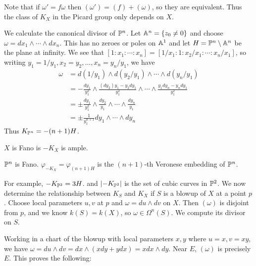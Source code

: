 \documentclass[twoside, 10pt]{article}
\begin{document}
        Note that if $\omega' = f\omega$ then $(\omega') = (f) + (\omega)$, so
        they are equivalent. Thus the class of $K_X$ in the Picard group only
        depends on $X$.

        \begin{exm} We calculate the canonical divisor of $\P^n$. Let $\A^n =
            \{ z_0 \neq 0 \}$ and choose $\omega = dx_1 \land \cdots \land
            dx_n$. This has no zeroes or poles on $\A^1$ and let $H = \P^n
            \setminus \A^n$ be the plane at infinity. We see that $[1:x_1:
            \cdots: x_n] = [1/x_1: 1 : x_2/x_1 : \cdots : x_n/x_1]$, so writing
            $y_1 = 1/y_1, x_2 = y_2, \ldots, x_n = y_n/y_1$, we have
            \begin{align*} \omega &= d(1/y_1) \land d(y_2/y_1) \land \cdots
                \land d(y_n/y_1) \\ &= -\frac{dy_1}{y_1^2} \land
                \frac{(dy_2)y_1 - y_2 dy_1}{y_1^2} \land \cdots \land
                \frac{y_1dy_n - y_ndy_1}{y_1^2} \\ &= \pm \frac{dy_1}{y_1^2}
                \land \frac{dy_2}{y_1} \land \cdots \land \frac{dy_n}{y_1} \\
                                                   &= \pm \frac{1}{y_1^{n+1}}
                                                   dy_1 \land \cdots \land dy_n
            \end{align*} Thus $K_{\P^n} = -(n+1)H$.  \end{exm}

        \begin{defn} $X$ is Fano is $-K_X$ is ample.  \end{defn}

        \begin{cor} $\P^n$ is Fano. $\varphi_{-K_X} = \varphi_{(n+1)H}$ is the
        $(n+1)$-th Veronese embedding of $\P^n$.  \end{cor}

        For example, $-K_{\P^2} = 3H$. and $\abs{-K_{\P^2}}$ is the set of
        cubic curves in $\P^2$. We now determine the relationship between $K_S$
        and $K_X$ if $S$ is a blowup of $X$ at a point $p$. Choose local
        parameters $u,v$ at $p$ and $\omega = du \land dv$ on $X$. Then
        $(\omega)$ is disjoint from $p$, and we know $k(S) = k(X)$, so $\omega
        \in \Omega^n(S)$. We compute its divisor on $S$.

        Working in a chart of the blowup with local parameters $x,y$ where $u =
        x, v = xy$, we have $\omega = du \land dv = dx \land (x dy + y dx) = x
        dx \land dy$. Near $E$, $(\omega)$ is precisely $E$. This proves the
        following:
\end{document}
